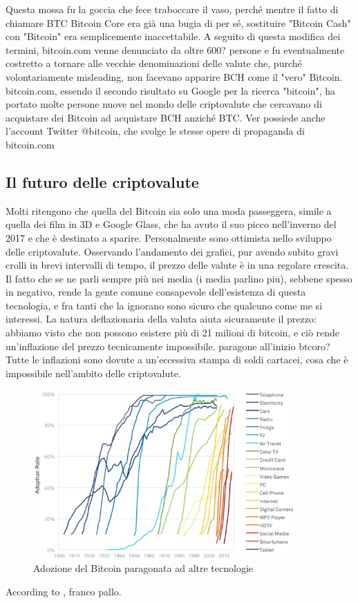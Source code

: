 \documentclass {article}
\begin{document}
Questa mossa fu la goccia che fece traboccare il vaso, perché mentre il fatto di chiamare BTC Bitcoin Core era già una bugia di per sé, sostituire "Bitcoin Cash" con "Bitcoin" era semplicemente inaccettabile.
A seguito di questa modifica dei termini, bitcoin.com venne denunciato da oltre 600? persone e fu eventualmente costretto a tornare alle vecchie denominazioni delle valute che, purché volontariamente misleading, non facevano apparire BCH come il "vero" Bitcoin.
bitcoin.com, essendo il secondo risultato su Google per la ricerca "bitcoin", ha portato molte persone nuove nel mondo delle criptovalute che cercavano di acquistare dei Bitcoin ad acquistare BCH anziché BTC.
Ver possiede anche l'account Twitter @bitcoin, che svolge le stesse opere di propaganda di bitcoin.com


\subsection {Il futuro delle criptovalute}


Molti ritengono che quella del Bitcoin sia solo una moda passeggera, simile a quella dei film in 3D e Google Glass, che ha avuto il suo picco nell'inverno del 2017 e che è destinato a sparire.
Personalmente sono ottimista nello sviluppo delle criptovalute.
Osservando l'andamento dei grafici, pur avendo subito gravi crolli in brevi intervalli di tempo, il prezzo delle valute è in una regolare crescita.
Il fatto che se ne parli sempre più nei media (i media parlino piu), sebbene spesso in negativo, rende la gente comune consapevole dell'esistenza di questa tecnologia, e fra tanti che la ignorano sono sicuro che qualcuno come me si interessi.
La natura deflazionaria della valuta aiuta sicuramente il prezzo: abbiamo visto che non possono esistere più di 21 milioni di bitcoin, e ciò rende un'inflazione del prezzo tecnicamente impossibile. paragone all'inizio btcoro?
Tutte le inflazioni sono dovute a un'eccessiva stampa di soldi cartacei, cosa che è impossibile nell'ambito delle criptovalute.

\vspace {0.5cm}
\begin{figure}[htb!]
\includegraphics [width = 10cm] {adoption.png}
\centering
\caption {Adozione del Bitcoin paragonata ad altre tecnologie}
\end{figure}
\vspace {0.2cm}
\noindent
%
According to \cite{roger}, franco pallo.

\newpage

\printbibliography[title = {Bibliografia}]
 
\end{document}
